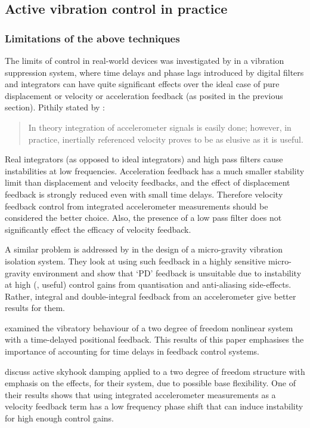 \subsection{Active vibration control in practice}

\subsubsection{Limitations of the above techniques}

The limits of control in real-world devices was investigated by \textcite{ananthaganeshan2001} in a vibration suppression system, where time delays and phase lags introduced by digital filters and integrators can have quite significant effects over the ideal case of pure displacement or velocity or acceleration feedback (as posited in the previous section). Pithily stated by \textcite{williams2009}:
\begin{quote}
In theory integration of accelerometer signals is easily done; however, in practice, inertially referenced velocity proves to be as elusive as it is useful.
\end{quote}
Real integrators (as opposed to ideal integrators) and high pass filters cause instabilities at low frequencies.
Acceleration feedback has a much smaller stability limit than displacement and velocity feedbacks, and the effect of displacement feedback is strongly reduced even with small time delays.
Therefore velocity feedback control from integrated accelerometer measurements should be considered the better choice.
Also, the presence of a low pass filter does not significantly effect the efficacy of velocity feedback.

A similar problem is addressed by \textcite{zhu2006} in the design of a micro-gravity vibration isolation system. They look at using such feedback in a highly sensitive micro-gravity environment and show that `PD' feedback is unsuitable due to instability at high (\ie, useful) control gains from quantisation and anti-aliasing side-effects.
Rather, integral and double-integral feedback from an accelerometer give better results for them.

\textcite{zhao2007} examined the vibratory behaviour of a two degree of freedom nonlinear system with a time-delayed positional feedback.
This results of this paper emphasises the importance of accounting for time delays in feedback control systems.

\textcite{serrand2000} discuss active skyhook damping applied to a two degree of freedom structure with emphasis on the effects, for their system, due to possible base flexibility.
One of their results shows that using integrated accelerometer measurements as a velocity feedback term has a low frequency phase shift that can induce instability for high enough control gains.

